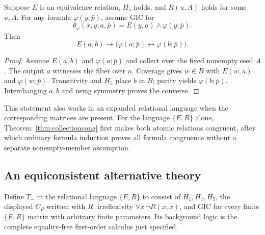 \begin{proposition}
\label{prop:saturation}
Suppose $E$ is an equivalence relation, $H_5$ holds, and
$R(u,A)$ holds for some $u,A$. For any formula
$\varphi(y;\bar p)$, assume GIC for
\[
 \theta_\varphi(x,y;a,\bar p)
 =E(y,a)\land\varphi(y;\bar p).
\]
Then
\[
 E(a,b)\to
 \bigl(\varphi(a;\bar p)\leftrightarrow\varphi(b;\bar p)\bigr).
\]
\end{proposition}
\begin{proof}
Assume $E(a,b)$ and $\varphi(a;\bar p)$ and collect over the
fixed nonempty seed $A$. The output $a$ witnesses the fiber
over $u$. Coverage gives $w\in B$ with $E(w,a)$ and
$\varphi(w;\bar p)$. Transitivity and $H_5$ place $b$ in $B$;
purity yields $\varphi(b;\bar p)$. Interchanging $a,b$
and using symmetry proves the converse.
\end{proof}

This statement also works in an expanded relational language
when the corresponding matrices are present. For the language
$\{E,R\}$ alone, Theorem~\ref{thm:collectioncong} first makes
both atomic relations congruent, after which ordinary formula
induction proves all formula congruence without a separate
nonempty-member assumption.

\subsection{An equiconsistent alternative theory}

Define $T_-$ in the relational language $\{E,R\}$ to consist of
$H_1,H_7,H_5$, the displayed $C_P$ written with $R$,
irreflexivity $\forall x\,\neg R(x,x)$, and GIC for every
finite $\{E,R\}$ matrix with arbitrary finite parameters.
Its background logic is the complete equality-free
first-order calculus just specified.


